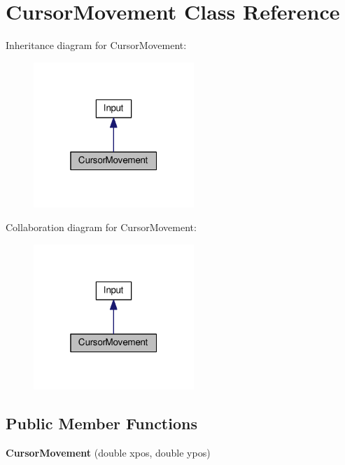\hypertarget{classCursorMovement}{}\section{Cursor\+Movement Class Reference}
\label{classCursorMovement}


Inheritance diagram for Cursor\+Movement\+:
\nopagebreak
\begin{figure}[H]
\begin{center}
\leavevmode
\includegraphics[width=172pt]{classCursorMovement__inherit__graph}
\end{center}
\end{figure}


Collaboration diagram for Cursor\+Movement\+:
\nopagebreak
\begin{figure}[H]
\begin{center}
\leavevmode
\includegraphics[width=172pt]{classCursorMovement__coll__graph}
\end{center}
\end{figure}
\subsection*{Public Member Functions}
\begin{DoxyCompactItemize}
\item 
\hypertarget{classCursorMovement_a5d4ae67fcfe792baff996121b694e7c3}{}{\bfseries Cursor\+Movement} (double xpos, double ypos)\label{classCursorMovement_a5d4ae67fcfe792baff996121b694e7c3}

\end{DoxyCompactItemize}
